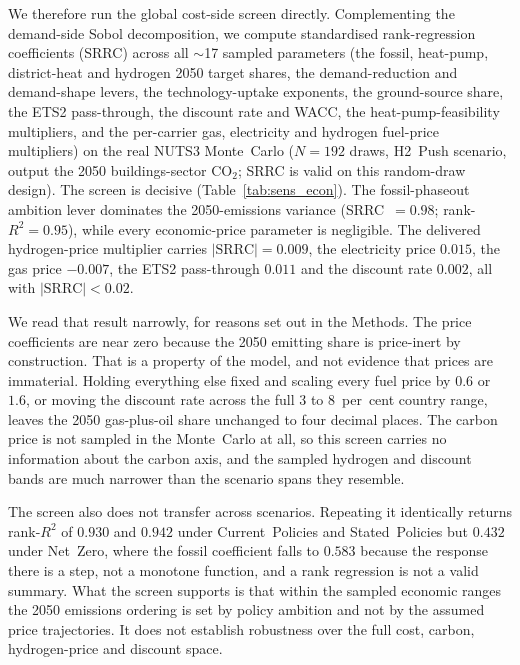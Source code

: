 We therefore run the global cost-side screen directly. Complementing the demand-side
Sobol decomposition, we compute standardised rank-regression coefficients (SRRC)
across all $\sim$17 sampled parameters (the fossil, heat-pump, district-heat and
hydrogen 2050 target shares, the demand-reduction and demand-shape levers, the
technology-uptake exponents, the ground-source share, the ETS2 pass-through, the
discount rate and WACC, the heat-pump-feasibility multipliers, and the per-carrier
gas, electricity and hydrogen fuel-price multipliers) on the real NUTS3 Monte~Carlo
($N=192$ draws, H2~Push scenario, output the 2050 buildings-sector CO$_2$; SRRC is
valid on this random-draw design). The screen is decisive
(Table~\ref{tab:sens_econ}). The fossil-phaseout ambition lever dominates the
2050-emissions variance (SRRC~$=0.98$; rank-$R^2=0.95$), while every
economic-price parameter is negligible. The delivered hydrogen-price multiplier
carries $|\text{SRRC}|=0.009$, the electricity price $0.015$, the gas price
$-0.007$, the ETS2 pass-through $0.011$ and the discount rate $0.002$, all with
$|\text{SRRC}|<0.02$.

We read that result narrowly, for reasons set out in the Methods. The price coefficients
are near zero because the 2050 emitting share is price-inert by construction. That is a
property of the model, and not evidence that prices are immaterial. Holding everything
else fixed and scaling
every fuel price by $0.6$ or $1.6$, or moving the discount rate across the full 3 to
8~per~cent country range, leaves the 2050 gas-plus-oil share unchanged to four decimal
places. The carbon price is not sampled in the Monte~Carlo at all, so this screen
carries no information about the carbon axis, and the sampled hydrogen and discount
bands are much narrower than the scenario spans they resemble.

The screen also does not transfer across scenarios. Repeating it identically returns
rank-$R^2$ of $0.930$ and $0.942$ under Current~Policies and Stated~Policies but $0.432$
under Net~Zero, where the fossil coefficient falls to $0.583$ because the response there is a step, not a monotone function, and a rank regression is not a valid summary. What
the screen supports is that within the sampled economic ranges the 2050 emissions
ordering is set by policy ambition and not by the assumed price trajectories. It does
not establish robustness over the full cost, carbon, hydrogen-price and discount space.



